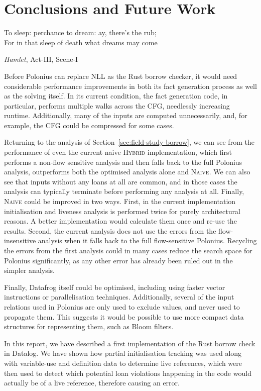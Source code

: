 \documentclass[11pt,a4paper,twoside,openany]{report}
\begin{document}
{\chapter{Conclusions and Future Work}\label{cha:conclusions}
\epigraph{To sleep: perchance to dream: ay, there's the rub;\\
  For in that sleep of death what dreams may come}%
{\textit{Hamlet}, Act-III, Scene-I}

Before Polonius can replace NLL as the Rust borrow checker, it would need
considerable performance improvements in both its fact generation process as
well as the solving itself. In its current condition, the fact generation code,
in particular, performs multiple walks across the CFG, needlessly increasing
runtime. Additionally, many of the inputs are computed unnecessarily, and, for
example, the CFG could be compressed for some cases.

Returning to the analysis of Section~\ref{sec:field-study-borrow}, we can see
from the performance of even the current naive \textsc{Hybrid} implementation,
which first performs a non-flow sensitive analysis and then falls back to the
full Polonius analysis, outperforms both the optimised analysis alone and
\textsc{Naive}. We can also see that inputs without any loans at all are common,
and in those cases the analysis can typically terminate before performing any
analysis at all. Finally, \textsc{Naive} could be improved in two ways. First,
in the current implementation initialisation and liveness analysis is performed
twice for purely architectural reasons. A better implementation would calculate
them once and re-use the results. Second, the current analysis does not use the
errors from the flow-insensitive analysis when it falls back to the full
flow-sensitive Polonius. Recycling the errors from the first analysis could in
many cases reduce the search space for Polonius significantly, as any other
error has already been ruled out in the simpler analysis.

Finally, Datafrog itself could be optimised, including using faster vector
instructions or parallelisation techniques. Additionally, several of the input
relations used in Polonius are only used to exclude values, and never used to
propagate them. This suggests it would be possible to use more compact data
structures for representing them, such as Bloom filters.

In this report, we have described a first implementation of the Rust borrow
check in Datalog. We have shown how partial initialisation tracking was used
along with variable-use and definition data to determine live references, which
were then used to detect which potential loan violations happening in the code
would actually be of a live reference, therefore causing an error.

}
\end{document}
